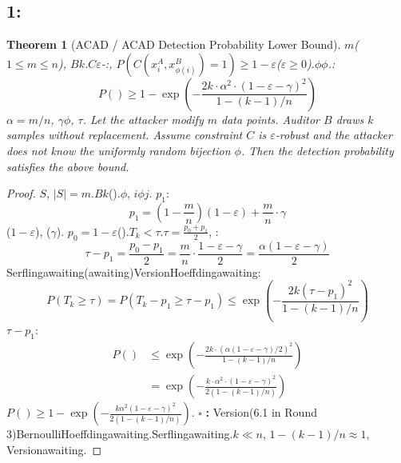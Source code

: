 \documentclass[11pt,a4paper]{article}
\theoremstyle{plain}
\newtheorem{theorem}{Theorem}[section]
\theoremstyle{definition}
\theoremstyle{remark}
\begin{document}
{\subsection{1:}
\begin{theorem}[ACAD / ACAD Detection Probability Lower Bound]
\label{thm:acad-detection}
$m$($1 \leq m \leq n$), $B$$k$.$C$$\varepsilon$-:, $P(C(x_i^A, x_{\phi(i)}^B) = 1) \geq 1 - \varepsilon$($\varepsilon \geq 0$).$\phi$$\phi$.: 
\begin{equation}
\boxed{P(\text{}) \geq 1 - \exp\left(-\frac{2k \cdot \alpha^2 \cdot (1 - \varepsilon - \gamma)^2}{1 - (k-1)/n}\right)}
\end{equation}
$\alpha = m/n$, $\gamma$$\phi$, $\tau$.
\textit{Let the attacker modify $m$ data points. Auditor $B$ draws $k$ samples without replacement. Assume constraint $C$ is $\varepsilon$-robust and the attacker does not know the uniformly random bijection $\phi$. Then the detection probability satisfies the above bound.}
\end{theorem}
\begin{proof}
$S$, $|S| = m$.$B$$k$().$\phi$, $i$$\phi$$j$.
$p_1$: 
\begin{equation}
 p_1 = \left(1 - \frac{m}{n}\right)(1 - \varepsilon) + \frac{m}{n} \cdot \gamma
\end{equation}
($1-\varepsilon$), ($\gamma$).
$p_0 = 1 - \varepsilon$().$T_k < \tau$.$\tau = \frac{p_0 + p_1}{2}$, : 
\begin{equation}
 \tau - p_1 = \frac{p_0 - p_1}{2} = \frac{m}{n} \cdot \frac{1 - \varepsilon - \gamma}{2} = \frac{\alpha(1 - \varepsilon - \gamma)}{2}
\end{equation}
Serflingawaiting(awaiting)VersionHoeffdingawaiting: 
\begin{equation}
 P(T_k \geq \tau) = P(T_k - p_1 \geq \tau - p_1) \leq \exp\left(-\frac{2k(\tau - p_1)^2}{1 - (k-1)/n}\right)
\end{equation}
$\tau - p_1$: 
\begin{align}
 P(\text{}) &\leq \exp\left(-\frac{2k \cdot (\alpha(1 - \varepsilon - \gamma)/2)^2}{1 - (k-1)/n}\right) \\
 &= \exp\left(-\frac{k \cdot \alpha^2 \cdot (1 - \varepsilon - \gamma)^2}{2(1 - (k-1)/n)}\right)
\end{align}
$P(\text{}) \geq 1 - \exp\left(-\frac{k \alpha^2 (1 - \varepsilon - \gamma)^2}{2(1 - (k-1)/n)}\right)$.
$\square$ \textbf{: } Version(6.1 in Round 3)BernoulliHoeffdingawaiting.Serflingawaiting.$k \ll n$, $1 - (k-1)/n \approx 1$, Versionawaiting.
\end{proof}
}
\end{document}
